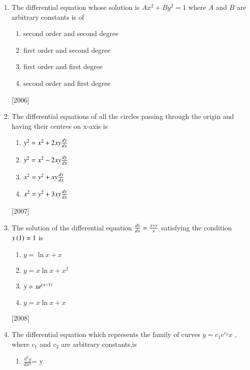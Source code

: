 \documentclass[journal]{IEEEtran}
\begin{document}
\begin{enumerate}
\item The differential equation whose solution is $Ax^2 + By^2 = 1$ where $A$ and $B$ are arbitrary constants is of 



\begin{multicols}{2}
\begin{enumerate}
    \item second order and second degree 
    \item first order and second degree 
    \item first order and first degree 
    \item second order and first degree 

\end{enumerate}
\end{multicols}
\hfill
{[2006]}
\item The differential equations of all the circles passing through the origin and having their centres on x-axis is
\begin{multicols}{2}
\begin{enumerate}
\item $ y^2=x^2 + 2xy\frac{d{y}}{d{x}} $
\item $ y^2=x^2 - 2xy\frac{d{y}}{d{x}}$
\item $ x^2=y^2 + xy\frac{d{y}}{d{x}}$
\item $ x^2 =y^2 + 3xy\frac{d{y}}{d{x}}$
\end{enumerate}
\end{multicols}
\hfill
{{[2007]}}




\item The solution of the differential equation $ \frac{d{y}}{d{x}}=\frac{x+y}{x}$ satisfying the condition $ y\left(1\right)=1 $ is
  \begin{multicols}{2}
    \begin{enumerate}
    \item $ y=  \ln{x}+x $
    \item $y=x\ln{x}+x^2$
    \item $ y=xe^{\left(x-1\right)} $
    \item $ y=x \ln{x}+ x$
       \end{enumerate}
   \end{multicols}
\hfill
{[2008]}


\item The differential equation which represents the family of curves $y= c{_1}e^{c_2}x$ , where $c{_1}$ and $c{_2}$ are arbitrary constants,is
\begin{multicols}{2}
 \begin{enumerate}
    \item $\frac{d^{2}y}{dx^{2}}$= y


\end{enumerate}
\end{multicols}
\end{enumerate}
\end{document}
